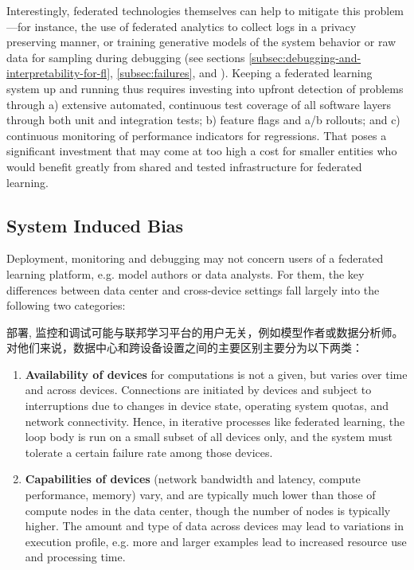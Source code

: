 Interestingly, federated technologies themselves can help to mitigate this problem---for instance, the use of federated analytics \citep{fablog20} to collect logs in a privacy preserving manner, or training generative models of the system behavior or raw data for sampling during debugging (see sections \ref{subsec:debugging-and-interpretability-for-fl}, \ref{subsec:failures}, and \citep{augenstein2019generative}).
Keeping a federated learning system up and running thus requires investing into upfront detection of problems through a) extensive automated, continuous test coverage of all software layers through both unit and integration tests; b) feature flags and a/b rollouts; and c) continuous monitoring of performance indicators for regressions. That poses a significant investment that may come at too high a cost for smaller entities who would benefit greatly from shared and tested infrastructure for federated learning.

\subsection{System Induced Bias}
\label{subsec:systems-system-induced-bias}
Deployment, monitoring and debugging may not concern users of a federated learning platform, e.g. model authors or data analysts. For them, the key differences between data center and cross-device settings fall largely into the following two categories:

部署, 监控和调试可能与联邦学习平台的用户无关，例如模型作者或数据分析师。对他们来说，数据中心和跨设备设置之间的主要区别主要分为以下两类：

\begin{enumerate}
    \item \textbf{Availability of devices} for computations is not a given, but varies over time and across devices. Connections are initiated by devices and subject to interruptions due to changes in device state, operating system quotas, and network connectivity. Hence, in iterative processes like federated learning, the loop body is run on a small subset of all devices only, and the system must tolerate a certain failure rate among those devices.
    \item \textbf{Capabilities of devices} (network bandwidth and latency, compute performance, memory) vary, and are typically much lower than those of compute nodes in the data center, though the number of nodes is typically higher. The amount and type of data across devices may lead to variations in execution profile, e.g. more and larger examples lead to increased resource use and processing time.
\end{enumerate}

